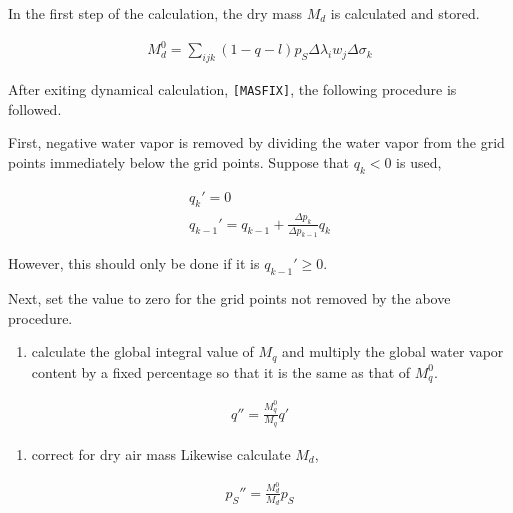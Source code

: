 In the first step of the calculation, the dry mass \(M_d\) is calculated
and stored.

\begin{eqnarray}
  M_d^0 = \sum_{ijk} (1-q-l) p_S \Delta\lambda_i w_j \Delta\sigma_k
\end{eqnarray}

After exiting dynamical calculation, \texttt{{[}MASFIX{]}}, the
following procedure is followed.

First, negative water vapor is removed by dividing the water vapor from
the grid points immediately below the grid points. Suppose that
\(q_k < 0\) is used,

\begin{eqnarray}
        q_k'      =  0          \\
        q_{k-1}'  =  q_{k-1} + \frac{\Delta p_k}{\Delta p_{k-1}} q_k
\end{eqnarray}

However, this should only be done if it is \(q_{k-1}' \ge 0\).

Next, set the value to zero for the grid points not removed by the above
procedure.

\begin{enumerate}
\def\labelenumi{\arabic{enumi}.}
\setcounter{enumi}{2}
\tightlist
\item
  calculate the global integral value of \(M_q\) and multiply the global
  water vapor content by a fixed percentage so that it is the same as
  that of \(M_q^0\).
\end{enumerate}

\begin{eqnarray}
        q'' = \frac{M_q^0}{M_q} q'
\end{eqnarray}

\begin{enumerate}
\def\labelenumi{\arabic{enumi}.}
\setcounter{enumi}{3}
\tightlist
\item
  correct for dry air mass Likewise calculate \(M_d\),
\end{enumerate}

\begin{eqnarray}
        p_S'' = \frac{M_d^0}{M_d} p_S
\end{eqnarray}
